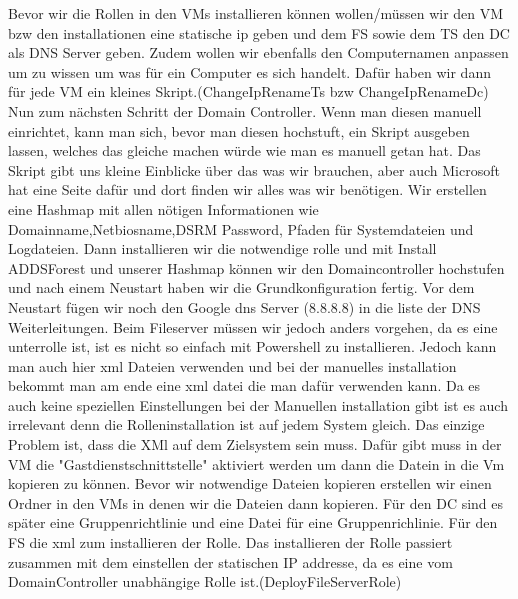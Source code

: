 \documentclass[conference]{IEEEtran}
\begin{document}
Bevor wir die Rollen in den VMs installieren können wollen/müssen wir den VM bzw den installationen eine statische ip geben und dem FS sowie dem TS den DC als DNS Server geben. Zudem wollen wir ebenfalls den Computernamen anpassen um zu wissen um was für ein Computer es sich handelt. Dafür haben wir dann für jede VM ein kleines Skript.(ChangeIpRenameTs bzw ChangeIpRenameDc)
Nun zum nächsten Schritt der Domain Controller. Wenn man diesen manuell einrichtet, kann man sich, bevor man diesen hochstuft, ein Skript ausgeben lassen, welches das gleiche machen würde wie man es manuell getan hat. Das Skript gibt uns kleine Einblicke über das was wir brauchen, aber auch Microsoft hat eine Seite dafür und dort finden wir alles was wir benötigen. Wir erstellen eine Hashmap mit allen nötigen Informationen wie Domainname,Netbiosname,DSRM Password, Pfaden für Systemdateien und Logdateien. Dann installieren wir die notwendige rolle und mit Install ADDSForest und unserer Hashmap können wir den Domaincontroller hochstufen und nach einem Neustart haben wir die Grundkonfiguration fertig. Vor dem Neustart fügen wir noch den Google dns Server (8.8.8.8) in die liste der DNS Weiterleitungen.
Beim Fileserver müssen wir jedoch anders vorgehen, da es eine unterrolle ist, ist es nicht so einfach mit Powershell zu installieren. Jedoch kann man auch hier xml Dateien verwenden und bei der manuelles installation bekommt man am ende eine xml datei die man dafür verwenden kann. Da es auch keine speziellen Einstellungen bei der Manuellen installation gibt ist es auch irrelevant denn die Rolleninstallation ist auf jedem System gleich. Das einzige Problem ist, dass die XMl auf dem Zielsystem sein muss. Dafür gibt muss in der VM die "Gastdienstschnittstelle" aktiviert werden um dann die Datein in die Vm kopieren zu können. Bevor wir notwendige Dateien kopieren erstellen wir einen Ordner in den VMs in denen wir die Dateien dann kopieren. Für den DC sind es später eine Gruppenrichtlinie und eine Datei für eine Gruppenrichlinie. Für den FS die xml zum installieren der Rolle. Das installieren der Rolle passiert zusammen mit dem einstellen der statischen IP addresse, da es eine vom DomainController unabhängige Rolle ist.(DeployFileServerRole)
\end{document}

